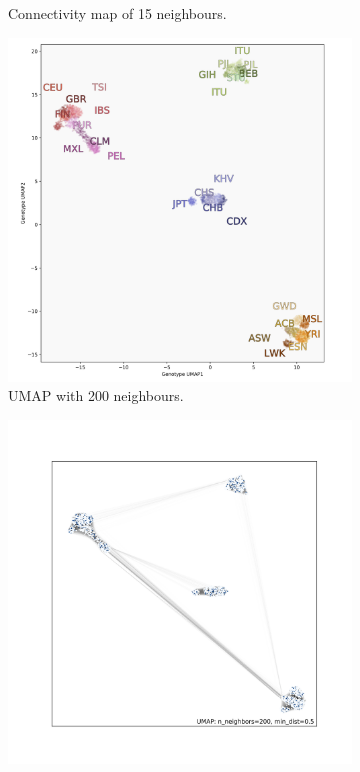\documentclass[12pt]{article}
\begin{document}
\begin{figure}[h!]
\begin{subfigure}[b]{0.48\linewidth}
    \caption{Connectivity map of 15 neighbours.}
    \label{fig:UMAP_low_NN_connectivity}
  \end{subfigure}
  \begin{subfigure}[b]{0.48\linewidth}
    \includegraphics[width=\linewidth]{code/images/1KGP_genotype_UMAP_high_NN.png}
    \caption{UMAP with 200 neighbours.}
    \label{fig:UMAP_high_NN_1KGP}
  \end{subfigure}
  \begin{subfigure}[b]{0.48\linewidth}
    \includegraphics[width=\linewidth]{code/images/UMAP_connectivity_high_NN.png}

\end{subfigure}
\end{figure}
\end{document}
